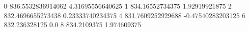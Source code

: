 0 836.5532836914062 4.31695556640625
1 834.16552734375 1.92919921875
2 832.4696655273438 0.23333740234375
4 831.7609252929688 -0.47540283203125
6 832.236328125 0.0
8 834.2109375 1.974609375
